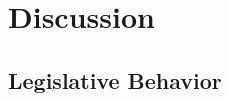 \documentclass{article}
\begin{document}
  \section{Discussion}
  \subsection{Legislative Behavior}
  \reminder
\pagebreak
\printbibliography
\end{document}
